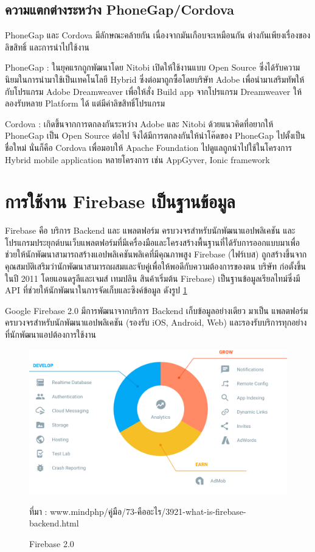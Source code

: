 		\subsection{ความแตกต่างระหว่าง PhoneGap/Cordova}
		PhoneGap และ Cordova มีลักษณะคล้ายกัน เนื่องจากมันเกือบจะเหมือนกัน ต่างกันเพียงเรื่องของลิขสิทธิ์ และการนำไปใช้งาน
		\item PhoneGap : ในยุคแรกถูกพัฒนาโดย Nitobi เปิดให้ใช้งานแบบ Open Source ซึ่งได้รับความนิยมในการนำมาใช้เป็นเทคโนโลยี Hybrid ซึ่งต่อมาถูกซื้อโดยบริษัท Adobe เพื่อนำมาเสริมทัพให้กับโปรแกรม Adobe Dreamweaver เพื่อให้สั่ง Build app จากโปรแกรม Dreamweaver ให้ลองรับหลาย Platform ได้ แต่มีค่าลิขสิทธิ์โปรแกรม
		\item Cordova : เกิดขึ้นจากการตกลงกันระหว่าง Adobe และ Nitobi ด้วยแนวคิดที่อยากให้ PhoneGap เป็น Open Source ต่อไป จึงได้มีการตกลงกันให้นำโค๊ดของ PhoneGap ไปตั้งเป็นชื่อใหม่ นั่นก็คือ Cordova เพื่อมอบให้ Apache Foundation ไปดูแลถูกนำไปใช้ในโครงการ Hybrid mobile application หลายโครงการ เช่น AppGyver, Ionic framework
		 




	\section{การใช้งาน Firebase เป็นฐานข้อมูล}
	Firebase \cite{bib9} คือ บริการ Backend และ แพลตฟอร์ม ครบวงจรสำหรับนักพัฒนาแอปพลิเคชัน และโปรแกรมประยุกต์บนเว็บแพลตฟอร์มที่มีเครื่องมือและโครงสร้างพื้นฐานที่ได้รับการออกแบบมาเพื่อช่วยให้นักพัฒนาสามารถสร้างแอปพลิเคชันพลิเคที่มีคุณภาพสูง Firebase (ไฟร์เบส) ถูกสร้างขึ้นจากคุณสมบัติเสริมว่านักพัฒนาสามารถผสมและจับคู่เพื่อให้พอดีกับความต้องการของตน บริษัท ก่อตั้งขึ้นในปี 2011 โดยแอนดรูลีและเจมส์ เทมปลิน สินค้าเริ่มต้น Firebase) เป็นฐานข้อมูลเรียลไทม์ซึ่งมี API ที่ช่วยให้นักพัฒนาในการจัดเก็บและซิงค์ข้อมูล ดังรูป \ref{Fig:class1}
	
	Google Firebase 2.0 มีการพัฒนาจากบริการ Backend เก็บข้อมูลอย่างเดียว มาเป็น แพลตฟอร์มครบวงจรสำหรับนักพัฒนาแอปพลิเคชัน (รองรับ iOS, Android, Web) และรองรับบริการทุกอย่างที่นักพัฒนาแอปต้องการใช้งาน
	
	\begin{figure}[H]
		\centering
		\includegraphics[width=\columnwidth]{Figures/2/firebase}
		\caption{Firebase 2.0}{ที่มา : www.mindphp/คู่มือ/73-คืออะไร/3921-what-is-firebase-backend.html}
		\label{Fig:class1}
	\end{figure}
